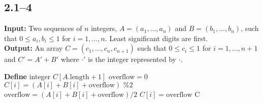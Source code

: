 \subsection*{2.1--4}

\noindent\textbf{Input:} Two sequences of $n$ integers, $A=(a_{1},\ldots,a_{n})$ and $B=(b_{1},\ldots,b_{n})$, such that $0\leq a_{i},b_{i}\leq 1$ for $i=1,\ldots,n$. Least significant digits are first.\\

\noindent\textbf{Output:} An array $C=(c_{1},\ldots,c_{n},c_{n+1})$ such that $0\leq c_{i}\leq 1$ for $i=1,\ldots,n+1$ and $C'=A'+B'$ where $\cdot'$ is the integer represented by $\cdot$.\\

\begin{algorithmic}[1]
	\State \textbf{Define} integer $C[A.\text{length}+1]$
	\State $\text{overflow}=0$
	\State $C[i] = (A[i]+B[i]+\text{overflow})\text{ \% }2$
	\State $\text{overflow} = (A[i]+B[i]+\text{overflow})/2$
	\EndFor
	\State $C[i]=\text{overflow}$
	\State \Return C
	\EndProcedure
\end{algorithmic}
